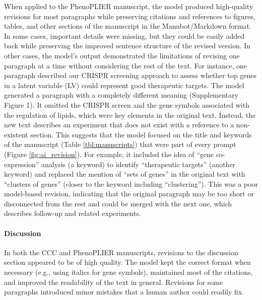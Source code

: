 \documentclass[
]{article}
\begin{document}
% 

When applied to the PhenoPLIER manuscript, the model produced high-quality revisions for most paragraphs while preserving citations and references to figures, tables, and other sections of the manuscript in the Manubot/Markdown format.
In some cases, important details were missing, but they could be easily added back while preserving the improved sentence structure of the revised version.
In other cases, the model's output demonstrated the limitations of revising one paragraph at a time without considering the rest of the text.
For instance, one paragraph described our CRISPR screening approach to assess whether top genes in a latent variable (LV) could represent good therapeutic targets.
The model generated a paragraph with a completely different meaning (Supplementary Figure 1).
It omitted the CRISPR screen and the gene symbols associated with the regulation of lipids, which were key elements in the original text.
Instead, the new text describes an experiment that does not exist with a reference to a non-existent section.
This suggests that the model focused on the title and keywords of the manuscript (Table \ref{tbl:manuscripts}) that were part of every prompt (Figure \ref{fig:ai_revision}).
For example, it included the idea of ``gene co-expression'' analysis (a keyword) to identify ``therapeutic targets'' (another keyword) and replaced the mention of ``sets of genes'' in the original text with ``clusters of genes'' (closer to the keyword including ``clustering'').
This was a poor model-based revision, indicating that the original paragraph may be too short or disconnected from the rest and could be merged with the next one, which describes follow-up and related experiments.

\paragraph{Discussion}

In both the CCC and PhenoPLIER manuscripts, revisions to the discussion section appeared to be of high quality.
The model kept the correct format when necessary (e.g., using italics for gene symbols), maintained most of the citations, and improved the readability of the text in general.
Revisions for some paragraphs introduced minor mistakes that a human author could readily fix.
\end{document}
